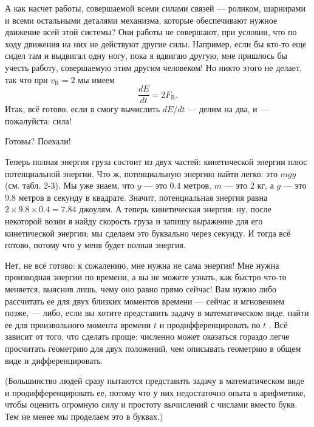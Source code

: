 \documentclass[11pt,oneside]{article}
\providecommand{\ddt}[2]{\frac{d#1}{d#2}}
\begin{document}
А как насчет работы, совершаемой всеми силами связей --- роликом, шарнирами и всеми остальными деталями механизма, которые обеспечивают нужное движение всей этой системы? Они работы не совершают, при условии, что по ходу движения на них не действуют другие силы. Например, если бы кто-то еще сидел там и выдвигал одну ногу, пока я вдвигаю другую, мне пришлось бы учесть работу, совершаемую этим другим человеком! Но никто этого не делает, так что при \(v_\text{R} = 2\) мы имеем 
\begin{equation*} \tag{2.24}
\label{Eq:TIPS:2:24} \ddt{E}{t} = 2F_\text{R}. \end{equation*}
 Итак, всё готово, если я смогу вычислить \(dE/dt\) --- делим на два, и --- пожалуйста: сила!\par

Готовы? Поехали!\par

Теперь полная энергия груза состоит из двух частей: кинетической энергии плюс потенциальной энергии. Что ж, потенциальную энергию найти легко: это \(mgy\) (см. табл. 2-3). Мы уже знаем, что \(y\) --- это \(0.4\) метров, \(m\) --- это \(2\) кг, а \(g\) --- это \(9.8\) метров в секунду в квадрате. Значит, потенциальная энергия равна \(2 \times 9.8 \times 0.4 = 7.84\) джоулям. А теперь кинетическая энергия: ну, после некоторой возни я найду скорость груза и запишу выражение для его кинетической энергии; мы сделаем это буквально через секунду. И тогда всё готово, потому что у меня будет полная энергия.\par

Нет, не всё готово: к сожалению, мне нужна не сама энергия! Мне нужна производная энергии по времени, а вы не можете узнать, как быстро что-то меняется, выяснив лишь, чему оно равно прямо сейчас! Вам нужно либо рассчитать ее для двух близких моментов времени --- сейчас и мгновением позже, --- либо, если вы хотите представить задачу в математическом виде, найти ее для произвольного момента времени \(t\) и продифференцировать по \(t\) . Всё зависит от того, что сделать проще: численно может оказаться гораздо легче просчитать геометрию для двух положений, чем описывать геометрию в общем виде и дифференцировать.\par

(Большинство людей сразу пытаются представить задачу в математическом виде и продифференцировать ее, потому что у них недостаточно опыта в арифметике, чтобы оценить огромную силу и простоту вычислений с числами вместо букв. Тем не менее мы проделаем это в буквах.)\par
\end{document}
